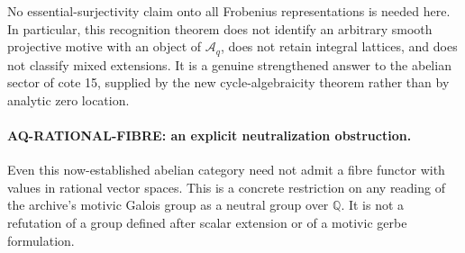 No essential-surjectivity claim onto all Frobenius
representations is needed here. In particular,
this recognition theorem does not identify an
arbitrary smooth projective motive with an object
of $\mathcal A_q$, does not retain integral lattices,
and does not classify mixed extensions. It is a
genuine strengthened answer to the abelian sector
of cote 15, supplied by the new cycle-algebraicity
theorem rather than by analytic zero location.

\paragraph{AQ-RATIONAL-FIBRE: an explicit neutralization obstruction.}
Even this now-established abelian category need not
admit a fibre functor with values in rational vector
spaces. This is a concrete restriction on any reading
of the archive's motivic Galois group as a neutral
group over $\mathbb Q$. It is not a refutation of a
group defined after scalar extension or of a motivic
gerbe formulation.
